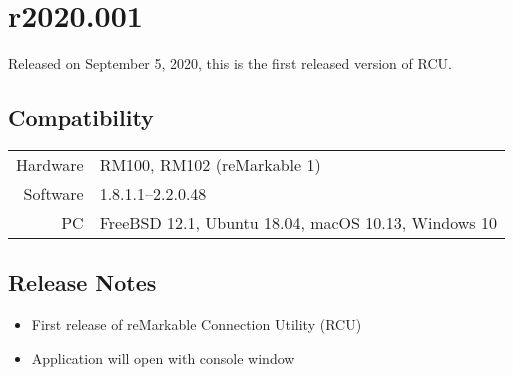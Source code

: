 \section{r2020.001}
\label{sec:r2020-001}
Released on September 5, 2020, this is the first released version of RCU.

\subsection{Compatibility}
\begin{tabular}{ r | l }
  Hardware & RM100, RM102 (reMarkable 1) \\
  Software & 1.8.1.1--2.2.0.48 \\
  PC & FreeBSD 12.1, Ubuntu 18.04, macOS 10.13, Windows 10 \\
\end{tabular}

\subsection{Release Notes}
\begin{itemize}
\item{First release of reMarkable Connection Utility (RCU)}
\item{Application will open with console window}
\end{itemize}

